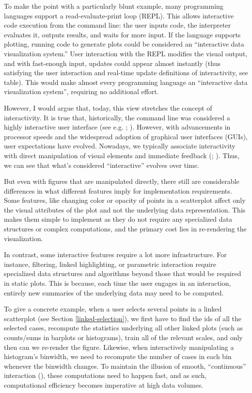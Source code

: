 \documentclass[
]{book}
\begin{document}
To make the point with a particularly blunt example, many programming languages support a read-evaluate-print loop (REPL). This allows interactive code execution from the command line: the user inputs code, the interpreter evaluates it, outputs results, and waits for more input. If the language supports plotting, running code to generate plots could be considered an ``interactive data visualization system.'' User interaction with the REPL modifies the visual output, and with fast-enough input, updates could appear almost instantly (thus satisfying the user interaction and real-time update definitions of interactivity, see table). This would make almost every programming language an ``interactive data visualization system'', requiring no additional effort.

However, I would argue that, today, this view stretches the concept of interactivity. It is true that, historically, the command line was considered a highly interactive user interface (see e.g. ; ). However, with advancements in processor speeds and the widespread adoption of graphical user interfaces (GUIs), user expectations have evolved. Nowadays, we typically associate interactivity with direct manipulation of visual elements and immediate feedback (; ). Thus, we can see that what's considered ``interactive'' evolves over time.

But even with figures that are manipulated directly, there still are considerable differences in what different features imply for implementation requirements. Some features, like changing color or opacity of points in a scatterplot affect only the visual attributes of the plot and not the underlying data representation. This makes them simple to implement as they do not require any specialized data structures or complex computations, and the primary cost lies in re-rendering the visualization.

In contrast, some interactive features require a lot more infrastructure. For instance, filtering, linked highlighting, or parametric interaction require specialized data structures and algorithms beyond those that would be required in static plots. This is because, each time the user engages in an interaction, entirely new summaries of the underlying data may need to be computed.

To give a concrete example, when a user selects several points in a linked scatterplot (see Section \ref{linked-selection}), we first have to find the ids of all the selected cases, recompute the statistics underlying all other linked plots (such as counts/sums in barplots or histograms), train all of the relevant scales, and only then can we re-render the figure. Likewise, when interactively manipulating a histogram's binwidth, we need to recompute the number of cases in each bin whenever the binwidth changes. To maintain the illusion of smooth, ``continuous'' interaction (), these computations need to happen fast, and as such, computational efficiency becomes imperative at high data volumes.
\end{document}
